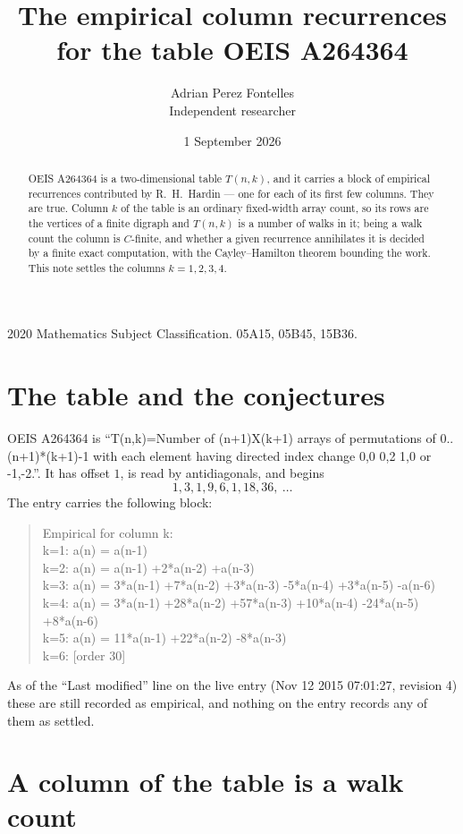 \documentclass[11pt,a4paper]{article}
\title{The empirical column recurrences for the table OEIS A264364}
\author{Adrian Perez Fontelles\\ \small Independent researcher}
\date{1 September 2026}
\theoremstyle{plain}
\theoremstyle{definition}
\begin{document}
\maketitle

\begin{abstract}
OEIS A264364 is a two-dimensional table $T(n,k)$, and it carries a block of empirical
recurrences contributed by R.~H.~Hardin --- one for each of its first few columns. They are
true. Column $k$ of the table is an ordinary fixed-width array count, so its rows are the
vertices of a finite digraph and $T(n,k)$ is a number of walks in it; being a walk count the
column is $C$-finite, and whether a given recurrence annihilates it is decided by a finite
exact computation, with the Cayley--Hamilton theorem bounding the work. This note settles the columns $k=1, 2, 3, 4$.
\end{abstract}

\noindent\small 2020 Mathematics Subject Classification. 05A15, 05B45, 15B36.\normalsize

\section{The table and the conjectures}

OEIS A264364 is ``T(n,k)=Number of (n+1)X(k+1) arrays of permutations of 0..(n+1)*(k+1)-1 with each element having directed index change 0,0 0,2 1,0 or -1,-2.''. It has offset $1$, is
read by antidiagonals, and begins
\[
1, 3, 1, 9, 6, 1, 18, 36,\ \dots
\]
The entry carries the following block:
\begin{quote}\small
Empirical for column k:\\
k=1: a(n) = a(n-1)\\
k=2: a(n) = a(n-1) +2*a(n-2) +a(n-3)\\
k=3: a(n) = 3*a(n-1) +7*a(n-2) +3*a(n-3) -5*a(n-4) +3*a(n-5) -a(n-6)\\
k=4: a(n) = 3*a(n-1) +28*a(n-2) +57*a(n-3) +10*a(n-4) -24*a(n-5) +8*a(n-6)\\
k=5: a(n) = 11*a(n-1) +22*a(n-2) -8*a(n-3)\\
k=6: [order 30]\\
\end{quote}
As of the ``Last modified'' line on the live entry (Nov 12 2015 07:01:27, revision 4) these are still
recorded as empirical, and nothing on the entry records any of them as settled.

\section{A column of the table is a walk count}
\end{document}
